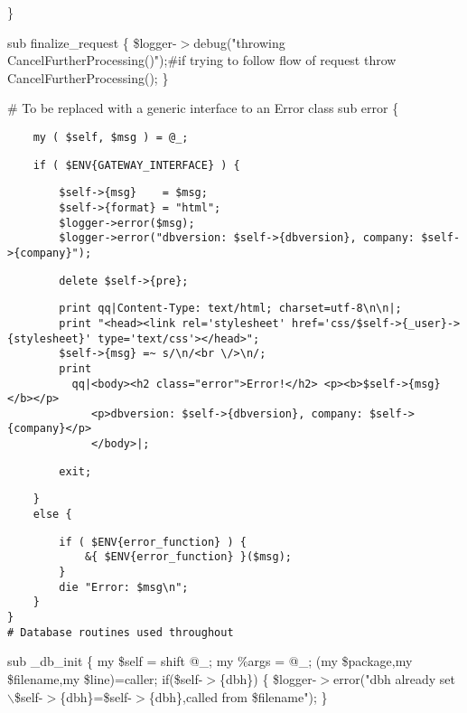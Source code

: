 \}



sub finalize\_request \{
    \$logger-$>$debug("throwing CancelFurtherProcessing()");\#if trying to follow flow of request
    throw CancelFurtherProcessing();
\}



\# To be replaced with a generic interface to an Error class
sub error \{

\begin{verbatim}
    my ( $self, $msg ) = @_;
\end{verbatim}
\begin{verbatim}
    if ( $ENV{GATEWAY_INTERFACE} ) {
\end{verbatim}
\begin{verbatim}
        $self->{msg}    = $msg;
        $self->{format} = "html";
        $logger->error($msg);
        $logger->error("dbversion: $self->{dbversion}, company: $self->{company}");
\end{verbatim}
\begin{verbatim}
        delete $self->{pre};
\end{verbatim}
\begin{verbatim}
        print qq|Content-Type: text/html; charset=utf-8\n\n|;
        print "<head><link rel='stylesheet' href='css/$self->{_user}->{stylesheet}' type='text/css'></head>";
        $self->{msg} =~ s/\n/<br \/>\n/;
        print
          qq|<body><h2 class="error">Error!</h2> <p><b>$self->{msg}</b></p>
             <p>dbversion: $self->{dbversion}, company: $self->{company}</p>
             </body>|;
\end{verbatim}
\begin{verbatim}
        exit;
\end{verbatim}
\begin{verbatim}
    }
    else {
\end{verbatim}
\begin{verbatim}
        if ( $ENV{error_function} ) {
            &{ $ENV{error_function} }($msg);
        }
        die "Error: $msg\n";
    }
}
# Database routines used throughout
\end{verbatim}


sub \_db\_init \{
    my \$self     = shift @\_;
    my \%args     = @\_;
    (my \$package,my \$filename,my \$line)=caller;
    if(\$self-$>$\{dbh\})
    \{
     \$logger-$>$error("dbh already set $\backslash$\$self-$>$\{dbh\}=\$self-$>$\{dbh\},called from \$filename");
    \}

